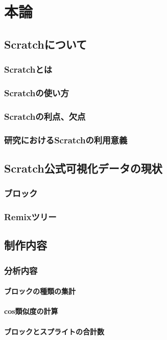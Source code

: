 \documentclass[a4paper,10pt,onecolumn,oneside,openany]{jsbook}
\begin{document}
\part{本論}
\chapter{Scratchについて}
\section{Scratchとは}
\section{Scratchの使い方}
\section{Scratchの利点、欠点}
\section{研究におけるScratchの利用意義}
\chapter{Scratch公式可視化データの現状}
\section{ブロック}
\section{Remixツリー}
\chapter{制作内容}
\section{分析内容}
\subsection{ブロックの種類の集計}
\subsection{cos類似度の計算}
\subsection{ブロックとスプライトの合計数}
\end{document}
